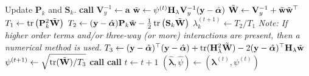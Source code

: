 \begin{algorithm}[H]
\begin{algorithmic}[1]
    \State Update $\mathbf P_k$ and $\mathbf S_k$. 
\EndProcedure	
\Statex
{}
		\State \textbf{call}  
		\State $\mathbf V_y^{-1} \gets \mathbf a$
		\State $\tilde{\mathbf w} \gets \psi^{(t)} \mathbf H_\lambda \mathbf V_y^{-1}(\mathbf y - \hat{\boldsymbol\alpha})$
		\State $\tilde{\mathbf W} \gets \mathbf V_y^{-1} + \tilde{\mathbf w}\tilde{\mathbf w}^\top$
	\EndProcedure
	\Statex
		\State $T_1 \gets \operatorname{tr}\big(\mathbf P_k^2 \tilde{\mathbf W}\big)$
		\State $T_2 \gets (\mathbf y - \hat{\boldsymbol\alpha})\mathbf P_k \tilde{\mathbf w} - \frac{1}{2}\operatorname{tr}\big(\mathbf S_k\tilde{\mathbf W}\big)$ 
		\State $\lambda_k^{(t+1)} \gets T_2/T_1$
	\EndFor
	\EndProcedure
	\State \textit{Note: If higher order terms and/or three-way (or more) interactions are present, then a numerical method is used.}
	\Statex
	 
    	\State $T_3 \gets (\mathbf y - \hat{\boldsymbol\alpha})^\top(\mathbf y - \hat{\boldsymbol\alpha}) + \operatorname{tr}(\mathbf H_\lambda^2 \tilde{\mathbf W}) - 2(\mathbf y - \hat{\boldsymbol\alpha})^\top\mathbf H_\lambda\tilde{\mathbf w}$
    	\State $\psi^{(t+1)} \gets \sqrt{\operatorname{tr}(\tilde{\mathbf W})/T_3}$ 
	\EndProcedure
	\Statex
	\State \textbf{call} 
	\State \textbf{call} 
	\State $t \gets t+1$
\EndWhile
\Statex
\State $(\hat{\boldsymbol\lambda}, \hat{\psi}) \gets (\boldsymbol\lambda^{(t)}, \psi^{(t)})$ 
\end{algorithmic}
\end{algorithm}